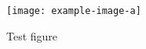 \documentclass{article}
\begin{document}
\begin{figure}
  \texttt{[image: example-image-a]}
  \caption{Test figure}
\end{figure}
\end{document}
